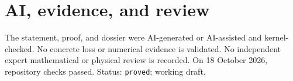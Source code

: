 \documentclass[11pt]{article}
\begin{document}
\section{AI, evidence, and review}
The statement, proof, and dossier were AI-generated or AI-assisted and kernel-checked.
No concrete loss or numerical evidence is validated. No independent expert mathematical
or physical review is recorded. On 18 October 2026, repository checks passed. Status:
\texttt{proved}; working draft.
\end{document}
